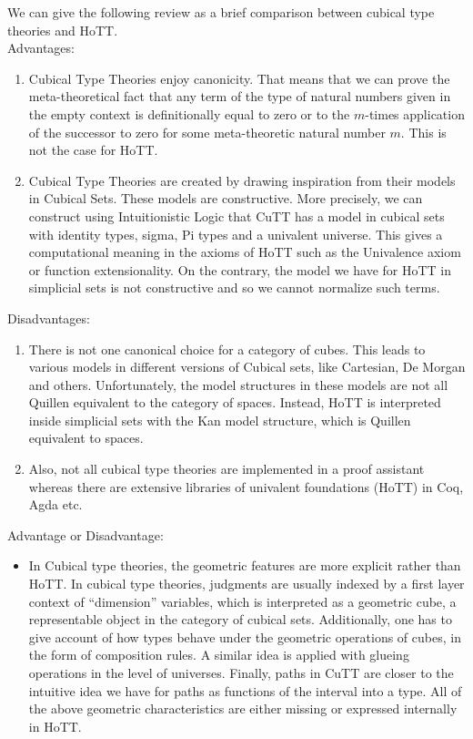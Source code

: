 \documentclass{article}
\theoremstyle{definition}
\begin{document}
We can give the following review as a brief comparison
between cubical type theories and HoTT. \\
Advantages:
\begin{enumerate}
 \item Cubical Type Theories enjoy canonicity. That means
 that we can prove the meta-theoretical fact that
 any term of the type of natural numbers given in
 the empty context is definitionally equal to
 zero or to the $m$-times application of the successor
 to zero for some meta-theoretic natural number $m$.
 This is not the case for HoTT.
 \item Cubical Type Theories are created by drawing
 inspiration from their models in Cubical Sets.
 These models are constructive. More precisely,
 we can construct using Intuitionistic Logic
 that CuTT has a model in cubical sets with
 identity types, sigma, Pi types and a univalent
 universe. This gives a computational meaning
 in the axioms of HoTT such as the Univalence
 axiom or function extensionality. On the contrary,
 the model we have for HoTT in simplicial sets
 is not constructive and so we cannot normalize
 such terms.
\end{enumerate}
Disadvantages:
\begin{enumerate}
 \item There is not one canonical choice for a
 category of cubes. This leads to various
 models in different versions of Cubical sets,
 like Cartesian, De Morgan and others.
 Unfortunately, the model structures in these
 models are not all Quillen equivalent to
 the category of spaces. Instead, HoTT
 is interpreted inside simplicial sets
 with the Kan model structure, which is
 Quillen equivalent to spaces.
 \item Also, not all cubical type theories
 are implemented in a proof assistant
 whereas there are extensive libraries of
 univalent foundations (HoTT) in Coq, Agda etc.
\end{enumerate}
Advantage or Disadvantage:
\begin{itemize}
 \item In Cubical type theories, the geometric
 features are more explicit rather than HoTT.
 In cubical type theories, judgments are usually
 indexed by a first layer context of ``dimension''
 variables, which is interpreted as a geometric
 cube, a representable object in the category
 of cubical sets. Additionally, one has to give
 account of how types behave under the geometric
 operations of cubes, in the form of composition
 rules. A similar idea is applied with
 glueing operations in the level of universes.
 Finally, paths in CuTT are closer to the
 intuitive idea we have for paths
 as functions of the interval into a type.
 All of the above geometric characteristics are
 either missing or expressed internally in HoTT.
\end{itemize}
\end{document}
